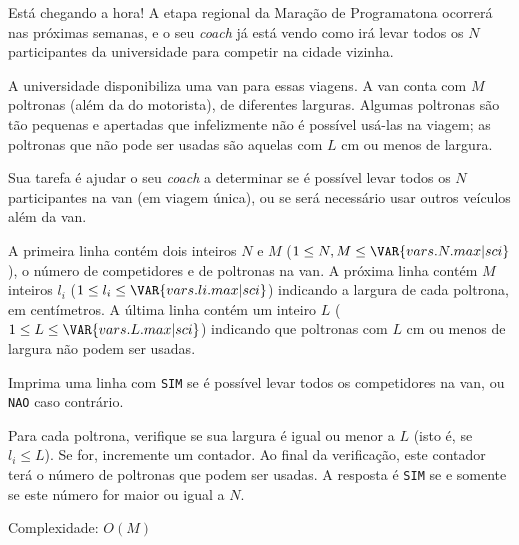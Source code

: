 Está chegando a hora! A etapa regional da Maração de Programatona ocorrerá nas
próximas semanas, e o seu \textit{coach} já está vendo como irá levar todos os $N$
participantes da universidade para competir na cidade vizinha.

A universidade disponibiliza uma van para essas viagens. A van conta com $M$
poltronas (além da do motorista), de diferentes larguras. Algumas poltronas são tão pequenas e
apertadas que infelizmente não é possível usá-las na viagem; as poltronas que
não pode ser usadas são aquelas com $L$ cm ou menos de largura.

Sua tarefa é ajudar o seu \textit{coach} a determinar se é possível levar todos
os $N$ participantes na van (em viagem única), ou se será necessário usar outros veículos além da van.


A primeira linha contém dois inteiros $N$ e $M$ ($1 \leq N, M \leq \VAR{vars.N.max | sci}$), o número de competidores e de poltronas na van.
A próxima linha contém $M$ inteiros $l_i$ ($1 \leq l_i \leq \VAR{vars.li.max | sci}$)
indicando a largura de cada poltrona, em centímetros.
A última linha contém um inteiro $L$ ($1 \leq L \leq \VAR{vars.L.max | sci}$)
indicando que poltronas com $L$ cm ou menos de largura não podem ser usadas.

Imprima uma linha com
\texttt{SIM} se é possível levar todos os competidores na
van, ou \texttt{NAO} caso contrário.

Para cada poltrona, verifique se sua largura é igual ou menor a $L$ (isto é, se
        $l_i \leq L$). Se for, incremente um contador.
Ao final da verificação, este contador terá o número de poltronas que podem ser
usadas. A resposta é \texttt{SIM} se e somente se este número for maior ou
igual a $N$.

Complexidade: $O(M)$
